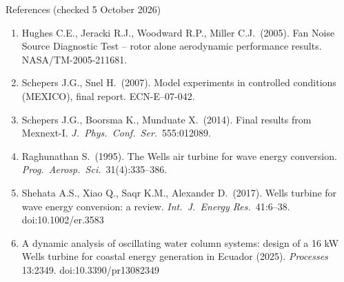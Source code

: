 \documentclass[aspectratio=169,10pt]{beamer}
\begin{document}
\begin{frame}[allowframebreaks]{References (checked 5 October 2026)}
\begin{enumerate}
\item Hughes C.E., Jeracki R.J., Woodward R.P., Miller C.J.\ (2005). Fan Noise Source Diagnostic Test -- rotor alone aerodynamic performance results. NASA/TM-2005-211681.
\item Schepers J.G., Snel H.\ (2007). Model experiments in controlled conditions (MEXICO), final report. ECN-E--07-042.
\item Schepers J.G., Boorsma K., Munduate X.\ (2014). Final results from Mexnext-I. \emph{J.\ Phys.\ Conf.\ Ser.}\ 555:012089.
\item Raghunathan S.\ (1995). The Wells air turbine for wave energy conversion. \emph{Prog.\ Aerosp.\ Sci.}\ 31(4):335--386.
\item Shehata A.S., Xiao Q., Saqr K.M., Alexander D.\ (2017). Wells turbine for wave energy conversion: a review. \emph{Int.\ J.\ Energy Res.}\ 41:6--38. doi:10.1002/er.3583
\item A dynamic analysis of oscillating water column systems: design of a 16 kW Wells turbine for coastal energy generation in Ecuador (2025). \emph{Processes} 13:2349. doi:10.3390/pr13082349
\end{enumerate}
\end{frame}
\end{document}
